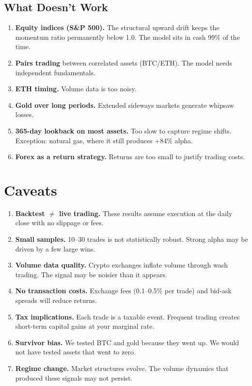 \documentclass[11pt,a4paper]{article}
\begin{document}
\subsection{What Doesn't Work}

\begin{enumerate}[leftmargin=2em]
    \item \textbf{Equity indices (S\&P 500).} The structural upward
          drift keeps the momentum ratio permanently below 1.0. The
          model sits in cash 99\% of the time.
    \item \textbf{Pairs trading} between correlated assets (BTC/ETH).
          The model needs independent fundamentals.
    \item \textbf{ETH timing.} Volume data is too noisy.
    \item \textbf{Gold over long periods.} Extended sideways markets
          generate whipsaw losses.
    \item \textbf{365-day lookback on most assets.} Too slow to
          capture regime shifts. Exception: natural gas, where it
          still produces +84\% alpha.
    \item \textbf{Forex as a return strategy.} Returns are too small
          to justify trading costs.
\end{enumerate}

\section{Caveats}

\begin{enumerate}[leftmargin=2em]
    \item \textbf{Backtest $\neq$ live trading.} These results assume
          execution at the daily close with no slippage or fees.

    \item \textbf{Small samples.} 10--30 trades is not statistically
          robust. Strong alpha may be driven by a few large wins.

    \item \textbf{Volume data quality.} Crypto exchanges inflate
          volume through wash trading. The signal may be noisier than
          it appears.

    \item \textbf{No transaction costs.} Exchange fees (0.1--0.5\%
          per trade) and bid-ask spreads will reduce returns.

    \item \textbf{Tax implications.} Each trade is a taxable event.
          Frequent trading creates short-term capital gains at your
          marginal rate.

    \item \textbf{Survivor bias.} We tested BTC and gold because they
          went up. We would not have tested assets that went to zero.

    \item \textbf{Regime change.} Market structures evolve. The
          volume dynamics that produced these signals may not persist.
\end{enumerate}
\end{document}

